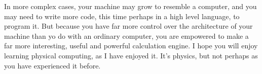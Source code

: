 \documentclass[../physical_computing.tex]{subfiles}
\begin{document}
In more complex cases, your machine may grow to resemble a computer, and you may need to write more code, this time perhaps in a high level language, to program it. But because you have far more control over the architecture of your machine than yo do with an ordinary computer, you are empowered to make a far more interesting, useful and powerful calculation engine. I hope you will enjoy learning physical computing, as I have enjoyed it. It's physics, but not perhaps as you have experienced it before.
\end{document}
